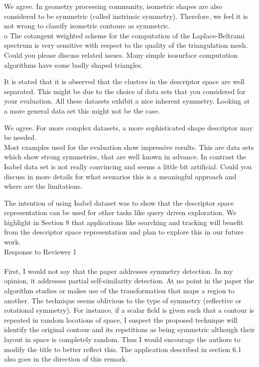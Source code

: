 \documentclass[10pt]{article}
\begin{document}
   {\color{blue} We agree. In geometry processing community,
	   isometric shapes are also considered to be symmetric (called instrinsic symmetry).
   Therefore, we feel it is not wrong to classify isometric contours as symmetric.}\\

   o The cotangent weighted scheme for the computation of the
   Laplace-Beltrami spectrum is very sensitive with respect to the quality
   of the triangulation mesh. Could you please discuss related issues. Many
   simple isosurface computation algorithms have some badly shaped
   triangles.

   It is stated that it is observed that the clusters in the descriptor
   space are well separated. This might be due to the choice of data sets
   that you considered for your evaluation. All these datasets exhibit a
   nice inherent symmetry. Looking at a more general data set this might not
   be the case.

   {\color{blue} We agree. For more complex datasets, a more sophisticated
   shape descriptor may be needed.}\\

	
   Most examples used for the evaluation show impressive results. This are
   data sets which show strong symmetries, that are well known in advance.
   In contrast the Isabel data set is not really convincing and seems a
   little bit artificial. Could you discuss in more details for what
   scenarios this is a meaningful approach and where are the limitations.

   {\color{blue}The intention of using Isabel dataset was to show that the descriptor space representation
	   can be used for other tasks like query driven exploration. We highlight in Section 8
	   that applications like searching and tracking will benefit from the descriptor
   space representation and plan to explore this in our future work.}\\

{\noindent \LARGE Response to Reviewer 1}\\\\
   First, I would not say that the paper addresses symmetry detection. In my
   opinion, it addresses partial self-similarity detection. At no point in
   the paper the algorithm studies or makes use of the transformation that
   maps a region to another. The technique seems oblivious to the type of
   symmetry (reflective or rotational symmetry). For instance, if a scalar
   field is given such that a contour is repeated in random locations of
   space, I suspect the proposed technique will identify the original
   contour and its repetitions as being symmetric although their layout in
   space is completely random. Thus I would encourage the authors to modify
   the title to better reflect this. The application described in section
   6.1 also goes in the direction of this remark.
\end{document}
